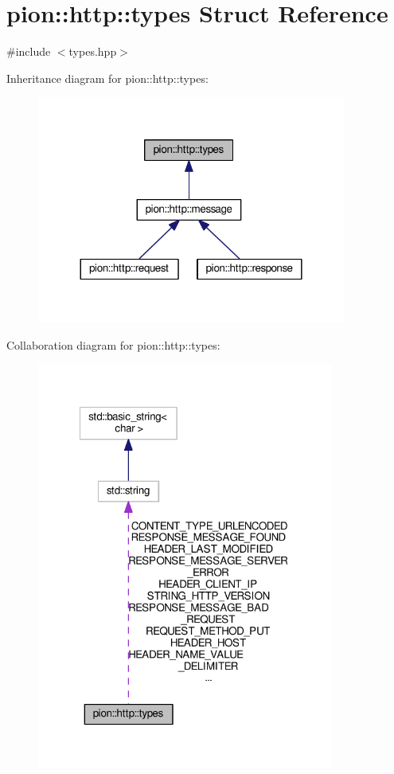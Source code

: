 \hypertarget{structpion_1_1http_1_1types}{\section{pion\-:\-:http\-:\-:types Struct Reference}
\label{structpion_1_1http_1_1types}
}


{\ttfamily \#include $<$types.\-hpp$>$}



Inheritance diagram for pion\-:\-:http\-:\-:types\-:
\nopagebreak
\begin{figure}[H]
\begin{center}
\leavevmode
\includegraphics[width=288pt]{structpion_1_1http_1_1types__inherit__graph}
\end{center}
\end{figure}


Collaboration diagram for pion\-:\-:http\-:\-:types\-:
\nopagebreak
\begin{figure}[H]
\begin{center}
\leavevmode
\includegraphics[width=276pt]{structpion_1_1http_1_1types__coll__graph}
\end{center}
\end{figure}
